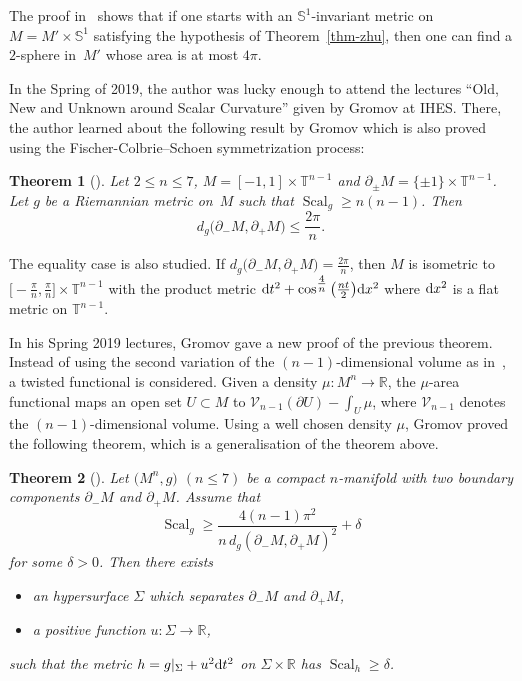 \documentclass[pdftex]{sigma}
\numberwithin{equation}{section}
\newtheorem{thm}{Theorem}[section]
\DeclareMathOperator{\scal}{Scal}
\begin{document}
\begin{rem}\label{rem-zhu}
 The proof in~\cite{zhu2020rigidity} shows that if one starts with an
 $\mathbb{S}^1$-invariant metric on $M=M'\times\mathbb{S}^1$
 satisfying the hypothesis of Theorem~\ref{thm-zhu}, then one can
 find a $2$-sphere in~$M'$ whose area is at most $4\pi$.
\end{rem}

In the Spring of 2019, the author was lucky enough to attend the
lectures ``Old, New and Unknown around Scalar Curvature'' given by
Gromov at IHES. There, the author learned about the following result by
Gromov which is also proved using the Fischer-Colbrie--Schoen
symmetrization process:
\begin{thm}[{\cite[p.~2]{gromov2018metric}}]
 Let $2\leq n\leq 7$, $M=[-1,1]\times \mathbb{T}^{n-1}$ and
 $\partial_{\pm}M=\{\pm 1\}\times \mathbb{T}^{n-1}$.
 Let $g$ be a Riemannian metric on~$M$
 such that $\scal_g\geq n(n-1)$. Then
 \[d_g\big(\partial_-M,\partial_+M\big)\leq\frac{2\pi}{n}. \]
\end{thm}
The equality case is also studied. If $d_g\big(\partial_-M,\partial_+M\big)=\frac{2\pi}{n}$, then $M$ is isometric to
$\big[{-}\tfrac{\pi}{n},\tfrac{\pi}{n}\big]\times\mathbb{T}^{n-1}$
with the product metric ${\rm d}t^2 + \cos^{\tfrac{4}{n}}\big(\frac{nt}{2}\big){\rm d}x^2$
where ${\rm d}x^2$ is a flat metric on $\mathbb{T}^{n-1}$.

In his Spring 2019 lectures, Gromov gave a new proof of the previous
theorem. Instead of using the second variation of the
$(n-1)$-dimensional volume as in~\cite{gromov2018metric}, a twisted
functional is considered. Given a density $\mu\colon M^n\to\mathbb{R}$, the
$\mu$-area functional maps an open set $U\subset M$ to
$\mathcal{V}_{n-1}(\partial U)-\int_U\mu$, where $\mathcal{V}_{n-1}$
denotes the $(n-1)$-dimensional volume. Using a well chosen
density $\mu$, Gromov proved the following theorem, which is a
generalisation of the theorem above.
\begin{thm}[{\cite[Section~5.3]{gromov2019four}}]\label{thm-gro}
 Let $\big(M^n,g\big)$ $(n\leq 7)$ be a compact $n$-manifold with two boundary components $\partial_-M$
 and $\partial_+M$. Assume that
 \[\scal_g\geq \frac{4(n-1)\pi^2}{n\, d_g(\partial_-M,
 \partial_+M)^2}+\delta\]
 for some $\delta>0$. Then there exists
 \begin{itemize}\itemsep=0pt
 \item an hypersurface $\Sigma$ which separates
 $\partial_-M$ and $\partial_+M$,
 \item a positive function
 $u\colon \Sigma\to\mathbb{R}$,
 \end{itemize}
 such that the metric
 $h=g|_{\Sigma}+u^2{\rm d}t^2$ on $\Sigma\times\mathbb{R}$ has $\scal_h\geq \delta$.
\end{thm}
\end{document}
